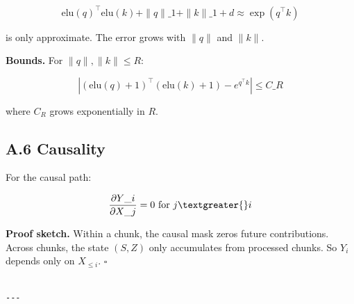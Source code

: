 \[
\text{elu}(q)^\top \text{elu}(k) + \|q\|\_1 + \|k\|\_1 + d \approx \exp(q^\top k)
\]

is only approximate. The error grows with $\|q\|$ and $\|k\|$.

\textbf{Bounds.} For $\|q\|, \|k\| \leq R$:

\[
\left|(\text{elu}(q)+1)^\top(\text{elu}(k)+1) - e^{q^\top k}\right| \leq C\_R
\]

where $C_R$ grows exponentially in $R$.

\subsection{A.6 Causality}

For the causal path:

\[
\frac{\partial Y\_i}{\partial X\_j} = 0 \text{ for } j \textgreater{} i
\]

\textbf{Proof sketch.} Within a chunk, the causal mask zeros future contributions. 
Across chunks, the state $(S, Z)$ only accumulates from processed chunks. 
So $Y_i$ depends only on $X_{\leq i}$. $\square$
\begin{lstlisting}

---
\end{lstlisting}
